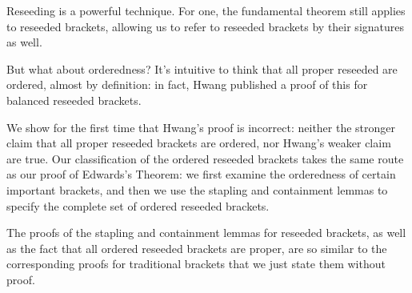 {    Reseeding is a powerful technique. For one, the fundamental theorem still applies to reseeded brackets, allowing us to refer to reseeded brackets by their signatures as well.


    But what about orderedness? It's intuitive to think that all proper reseeded are ordered, almost by definition: in fact, Hwang \cite{reseeding} published a proof of this for balanced reseeded brackets.


    We show for the first time that Hwang's proof is incorrect: neither the stronger claim that all proper reseeded brackets are ordered, nor Hwang's weaker claim are true. Our classification of the ordered reseeded brackets takes the same route as our proof of Edwards's Theorem: we first examine the orderedness of certain important brackets, and then we use the stapling and containment lemmas to specify the complete set of ordered reseeded brackets.

    The proofs of the stapling and containment lemmas for reseeded brackets, as well as the fact that all ordered reseeded brackets are proper, are so similar to the corresponding proofs for traditional brackets that we just state them without proof.



}
